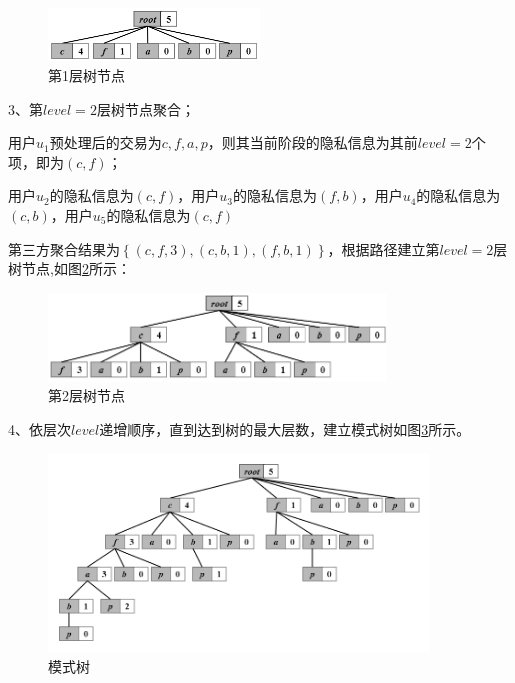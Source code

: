 \documentclass[UTF8,a4paper]{ctexart}
\begin{document}
  \begin{figure}[h]
    \centering
    \includegraphics[width=0.5\textwidth]{level_1}
    \caption{第1层树节点}
    \label{figure:levelone}
  \end{figure}

3、第$level=2$层树节点聚合；

用户$u_{1}$预处理后的交易为{\color{red}$c,f,a,p$}，则其当前阶段的隐私信息为其前$level=2$个项，即为$(c,f)$；

用户$u_{2}$的隐私信息为$(c,f)$，用户$u_{3}$的隐私信息为$(f,b)$，用户$u_{4}$的隐私信息为$(c,b)$，用户$u_{5}$的隐私信息为$(c,f)$

第三方聚合结果为$\left \{ (c,f,3) , (c,b,1) , (f,b,1) \right \}$，根据路径建立第$level=2$层树节点,如图\ref{figure:leveltwo}所示：

  \begin{figure}[h]
    \centering
    \includegraphics[width=0.8\textwidth]{level_2}
    \caption{第2层树节点}
    \label{figure:leveltwo}
  \end{figure}

4、依层次$level$递增顺序，直到达到树的最大层数，建立模式树如图\ref{figure:tree}所示。

  \begin{figure}[!]
    \centering
    \includegraphics[width=0.9\textwidth]{tree}
    \caption{模式树}
    \label{figure:tree}
  \end{figure}
\end{document}
